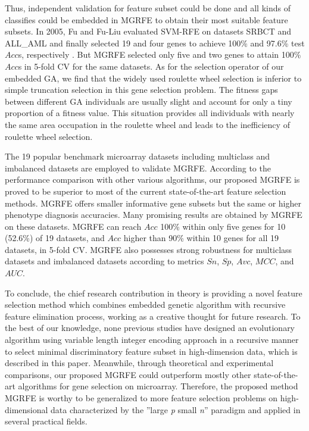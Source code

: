\documentclass[10pt,journal,compsoc]{IEEEtran}
\begin{document}
	Thus, independent validation for feature subset could be done and all kinds of classifies could be embedded in MGRFE to obtain their most suitable feature subsets.
	In 2005, Fu and Fu-Liu evaluated SVM-RFE on datasets SRBCT and ALL\_AML and finally selected 19 and four genes to achieve 100\% and 97.6\% test $Acc$s, respectively \cite{P10}. But MGRFE selected only five and two genes to attain 100\% $Acc$s in 5-fold CV for the same datasets.
	As for the selection operator of our embedded GA, we find that the widely used roulette wheel selection \cite{P37} is inferior to simple truncation selection in this gene selection problem. The fitness gaps between different GA individuals are usually slight and account for only a tiny proportion of a fitness value. This situation provides all individuals with nearly the same area occupation in the roulette wheel and leads to the inefficiency of roulette wheel selection. 
	
	The 19 popular benchmark microarray datasets including multiclass and imbalanced datasets are employed to validate MGRFE. According to the performance comparison with other various algorithms, our proposed MGRFE is proved to be superior to most of the current state-of-the-art feature selection methods. MGRFE offers smaller informative gene subsets but the same or higher phenotype diagnosis accuracies. Many promising results are obtained by MGRFE on these datasets. MGRFE can reach $Acc$ 100\% within only five genes for 10 (52.6\%) of 19 datasets, and $Acc$ higher than 90\% within 10 genes for all 19 datasets, in 5-fold CV. MGRFE also possesses strong robustness for multiclass datasets and imbalanced datasets according to metrics $Sn$, $Sp$, $Avc$, $MCC$, and $AUC$.
	
	To conclude, the chief research contribution in theory is providing a novel feature selection method which combines embedded genetic algorithm with recursive feature elimination process, working as a creative thought for future research. To the best of our knowledge, none previous studies have designed an evolutionary algorithm using variable length integer encoding approach in a recursive manner to select minimal discriminatory feature subset in high-dimension data, which is described in this paper. Meanwhile, through theoretical and experimental comparisons, our proposed MGRFE could outperform mostly other state-of-the-art algorithms for gene selection on microarray. Therefore, the proposed method MGRFE is worthy to be generalized to more feature selection problems on high-dimensional data characterized by the ”large \textit{p} small \textit{n}” paradigm and applied in several practical fields.
\end{document}
